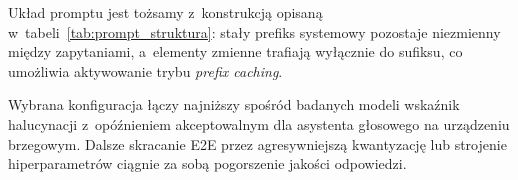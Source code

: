 Układ promptu jest tożsamy z~konstrukcją opisaną
w~tabeli~\ref{tab:prompt_struktura}: stały prefiks systemowy pozostaje
niezmienny między zapytaniami, a~elementy zmienne trafiają wyłącznie
do sufiksu, co umożliwia aktywowanie trybu \emph{prefix caching}.

Wybrana konfiguracja łączy najniższy spośród badanych modeli wskaźnik
halucynacji z~opóźnieniem akceptowalnym dla asystenta głosowego
na urządzeniu brzegowym. Dalsze skracanie E2E przez agresywniejszą
kwantyzację lub strojenie hiperparametrów ciągnie za sobą pogorszenie jakości odpowiedzi.
